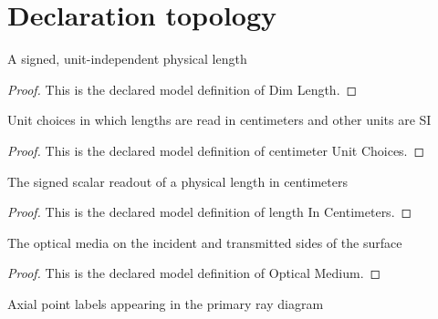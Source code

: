 \section{Declaration topology}
\begin{definition}
  \label{def:physics:phyx-mini-0041:phyxminiproblems-problemphyxmini0041-dimlength}
  A signed, unit-independent physical length
\end{definition}
\begin{proof}
  This is the declared model definition of Dim Length.
\end{proof}
\begin{definition}
  \label{def:physics:phyx-mini-0041:phyxminiproblems-problemphyxmini0041-centimeterunitchoices}
  Unit choices in which lengths are read in centimeters and other units are SI
\end{definition}
\begin{proof}
  This is the declared model definition of centimeter Unit Choices.
\end{proof}
\begin{definition}
  \label{def:physics:phyx-mini-0041:phyxminiproblems-problemphyxmini0041-lengthincentimeters}
  The signed scalar readout of a physical length in centimeters
\end{definition}
\begin{proof}
  This is the declared model definition of length In Centimeters.
\end{proof}
\begin{definition}
  \label{def:physics:phyx-mini-0041:phyxminiproblems-problemphyxmini0041-opticalmedium}
  The optical media on the incident and transmitted sides of the surface
\end{definition}
\begin{proof}
  This is the declared model definition of Optical Medium.
\end{proof}
\begin{definition}
  \label{def:physics:phyx-mini-0041:phyxminiproblems-problemphyxmini0041-figurepoint}
  Axial point labels appearing in the primary ray diagram
\end{definition}
